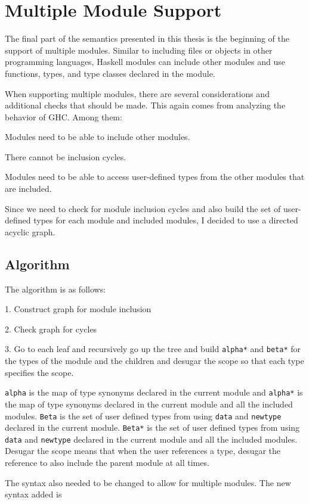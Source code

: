 \chapter{Multiple Module Support}
The final part of the semantics presented in this thesis is the beginning of the support of multiple modules. Similar to including files or objects in other programming languages, Haskell modules can include other modules and use functions, types, and type classes declared in the module.

When supporting multiple modules, there are several considerations and additional checks that should be made. This again comes from analyzing the behavior of GHC.
Among them:

Modules need to be able to include other modules.

There cannot be inclusion cycles.

Modules need to be able to access user-defined types from the other modules that are included.

Since we need to check for module inclusion cycles and also build the set of user-defined types for each module and included modules, I decided to use a directed acyclic graph.

\section{Algorithm}
The algorithm is as follows:

1. Construct graph for module inclusion

2. Check graph for cycles

3. Go to each leaf and recursively go up the tree and build \texttt{alpha*} and \texttt{beta*} for the types of the module and the children and desugar the scope so that each type specifies the scope.

\texttt{alpha} is the map of type synonyms declared in the current module and \texttt{alpha*} is the map of type synonyms declared in the current module and all the included modules. \texttt{Beta} is the set of user defined types from using \texttt{data} and \texttt{newtype} declared in the current module. \texttt{Beta*} is the set of user defined types from using \texttt{data} and \texttt{newtype} declared in the current module and all the included modules. 
Desugar the scope means that when the user references a type, desugar the reference to also include the parent module at all times.

The syntax also needed to be changed to allow for multiple modules. The new syntax added is

